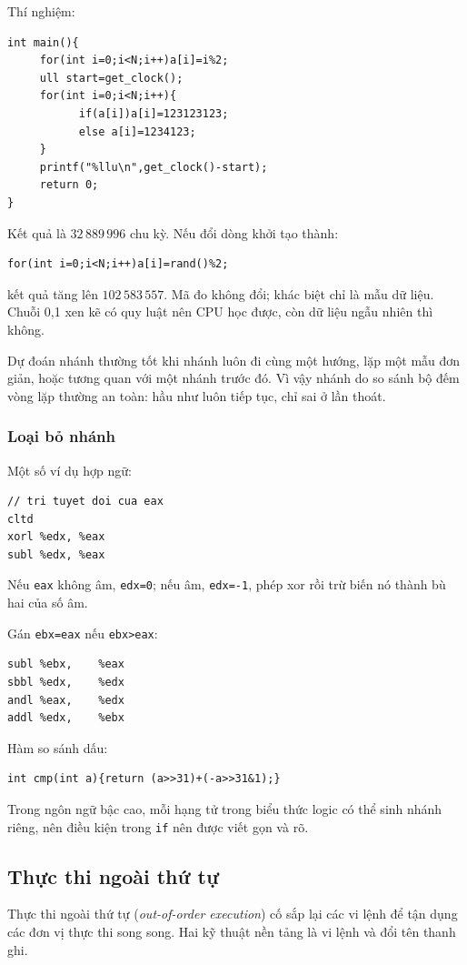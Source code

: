 \documentclass[11pt]{article}
\begin{document}
Thí nghiệm:
\begin{verbatim}
int main(){
     for(int i=0;i<N;i++)a[i]=i%2;
     ull start=get_clock();
     for(int i=0;i<N;i++){
           if(a[i])a[i]=123123123;
           else a[i]=1234123;
     }
     printf("%llu\n",get_clock()-start);
     return 0;
}
\end{verbatim}
Kết quả là \(32\,889\,996\) chu kỳ. Nếu đổi dòng khởi tạo thành:
\begin{verbatim}
for(int i=0;i<N;i++)a[i]=rand()%2;
\end{verbatim}
kết quả tăng lên \(102\,583\,557\). Mã đo không đổi; khác biệt chỉ là mẫu dữ
liệu. Chuỗi 0,1 xen kẽ có quy luật nên CPU học được, còn dữ liệu ngẫu nhiên
thì không.

Dự đoán nhánh thường tốt khi nhánh luôn đi cùng một hướng, lặp một mẫu đơn
giản, hoặc tương quan với một nhánh trước đó. Vì vậy nhánh do so sánh bộ đếm
vòng lặp thường an toàn: hầu như luôn tiếp tục, chỉ sai ở lần thoát.

\subsubsection{Loại bỏ nhánh}

Một số ví dụ hợp ngữ:
\begin{verbatim}
// tri tuyet doi cua eax
cltd
xorl %edx, %eax
subl %edx, %eax
\end{verbatim}
Nếu \texttt{eax} không âm, \texttt{edx=0}; nếu âm, \texttt{edx=-1}, phép xor
rồi trừ biến nó thành bù hai của số âm.

Gán \texttt{ebx=eax} nếu \texttt{ebx>eax}:
\begin{verbatim}
subl %ebx,    %eax
sbbl %edx,    %edx
andl %eax,    %edx
addl %edx,    %ebx
\end{verbatim}

Hàm so sánh dấu:
\begin{verbatim}
int cmp(int a){return (a>>31)+(-a>>31&1);}
\end{verbatim}

Trong ngôn ngữ bậc cao, mỗi hạng tử trong biểu thức logic có thể sinh nhánh
riêng, nên điều kiện trong \texttt{if} nên được viết gọn và rõ.

\subsection{Thực thi ngoài thứ tự}

Thực thi ngoài thứ tự (\textit{out-of-order execution}) cố sắp lại các vi
lệnh để tận dụng các đơn vị thực thi song song. Hai kỹ thuật nền tảng là vi
lệnh và đổi tên thanh ghi.
\end{document}
